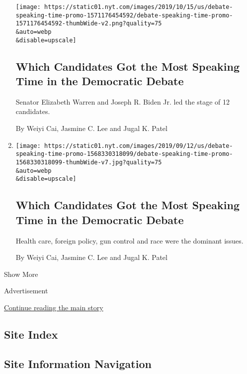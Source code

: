 \begin{enumerate}
  \texttt{[image: https://static01.nyt.com/images/2019/10/15/us/debate-speaking-time-promo-1571176454592/debate-speaking-time-promo-1571176454592-thumbWide-v2.png?quality=75\\\&auto=webp\\\&disable=upscale]}

  \hypertarget{which-candidates-got-the-most-speaking-time-in-the-democratic-debate-2}{%
  \subsection{Which Candidates Got the Most Speaking Time in the
  Democratic
  Debate}\label{which-candidates-got-the-most-speaking-time-in-the-democratic-debate-2}}

  Senator Elizabeth Warren and Joseph R. Biden Jr. led the stage of 12
  candidates.

  By Weiyi Cai, Jasmine C. Lee and Jugal K. Patel
\item
  \href{/interactive/2019/09/12/us/elections/debate-speaking-time.html}{}

  \texttt{[image: https://static01.nyt.com/images/2019/09/12/us/debate-speaking-time-promo-1568330318099/debate-speaking-time-promo-1568330318099-thumbWide-v7.jpg?quality=75\\\&auto=webp\\\&disable=upscale]}

  \hypertarget{which-candidates-got-the-most-speaking-time-in-the-democratic-debate-3}{%
  \subsection{Which Candidates Got the Most Speaking Time in the
  Democratic
  Debate}\label{which-candidates-got-the-most-speaking-time-in-the-democratic-debate-3}}

  Health care, foreign policy, gun control and race were the dominant
  issues.

  By Weiyi Cai, Jasmine C. Lee and Jugal K. Patel
\end{enumerate}

Show More

Advertisement

\protect\hyperlink{after-mid2}{Continue reading the main story}

\hypertarget{site-index}{%
\subsection{Site Index}\label{site-index}}

\hypertarget{site-information-navigation}{%
\subsection{Site Information
Navigation}\label{site-information-navigation}}

